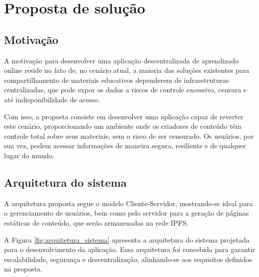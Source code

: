 \chapter[Proposta de solução]{Proposta de solução}
\label{cap:proposta}
\section[Motivação]{Motivação}
A motivação para desenvolver uma aplicação descentralizada de aprendizado online reside no fato de, no cenário atual, a maioria das soluções existentes para compartilhamento de materiais educativos dependerem de infraestruturas centralizadas, que pode expor os dados a riscos de controle excessivo, censura e até indisponibilidade de acesso.

Com isso, a proposta consiste em desenvolver uma aplicação capaz de reverter este cenário, proporcionando um ambiente onde os criadores de conteúdo têm controle total sobre seus materiais, sem o risco de ser censurado. Os usuários, por sua vez, podem acessar informações de maneira segura, resiliente e de qualquer lugar do mundo.

\section[Arquitetura do sistema]{Arquitetura do sistema}

A arquitetura proposta segue o modelo Cliente-Servidor, mostrando-se ideal para o gerenciamento de usuários, bem como pelo servidor para a geração de páginas estáticas de conteúdo, que serão armazenadas na rede IPFS.

A Figura \ref{fig:arquitetura_sistema} apresenta a arquitetura do sistema projetada para o desenvolvimento da aplicação. Essa arquitetura foi concebida para garantir escalabilidade, segurança e descentralização, alinhando-se aos requisitos definidos na proposta.



